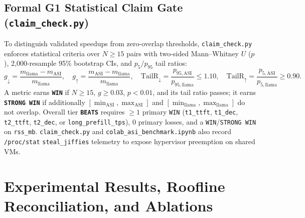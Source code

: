 \documentclass[11pt,a4paper]{article}
\begin{document}
\subsection{Formal G1 Statistical Claim Gate (\texttt{claim\_check.py})}
To distinguish validated speedups from zero-overlap thresholds, \texttt{claim\_check.py} enforces statistical criteria over $N \ge 15$ pairs with two-sided Mann--Whitney $U$ ($p$), 2,000-resample 95\% bootstrap CIs, and $p_5/p_{95}$ tail ratios:
\begin{equation}
\label{eq:g1_rules}
g_{\downarrow} = \frac{m_{\mathrm{llama}} - m_{\mathrm{ASI}}}{m_{\mathrm{llama}}},\quad
g_{\uparrow} = \frac{m_{\mathrm{ASI}} - m_{\mathrm{llama}}}{m_{\mathrm{llama}}},\quad
\mathrm{TailR}_{\downarrow} = \frac{p_{95,\mathrm{ASI}}}{p_{95,\mathrm{llama}}} \le 1.10,\quad
\mathrm{TailR}_{\uparrow} = \frac{p_{5,\mathrm{ASI}}}{p_{5,\mathrm{llama}}} \ge 0.90.
\end{equation}
A metric earns \textbf{\texttt{WIN}} if $N \ge 15$, $g \ge 0.03$, $p < 0.01$, and its tail ratio passes; it earns \textbf{\texttt{STRONG WIN}} if additionally $[\min_{\mathrm{ASI}}, \max_{\mathrm{ASI}}]$ and $[\min_{\mathrm{llama}}, \max_{\mathrm{llama}}]$ do not overlap. Overall tier \textbf{\texttt{BEATS}} requires $\ge 1$ primary \texttt{WIN} (\texttt{t1\_ttft}, \texttt{t1\_dec}, \texttt{t2\_ttft}, \texttt{t2\_dec}, or \texttt{long\_prefill\_tps}), $0$ primary losses, and a \texttt{WIN}/\texttt{STRONG WIN} on \texttt{rss\_mb}. \texttt{claim\_check.py} and \texttt{colab\_asi\_benchmark.ipynb} also record \texttt{/proc/stat} \texttt{steal\_jiffies} telemetry to expose hypervisor preemption on shared VMs.

\section{Experimental Results, Roofline Reconciliation, and Ablations}
\end{document}
